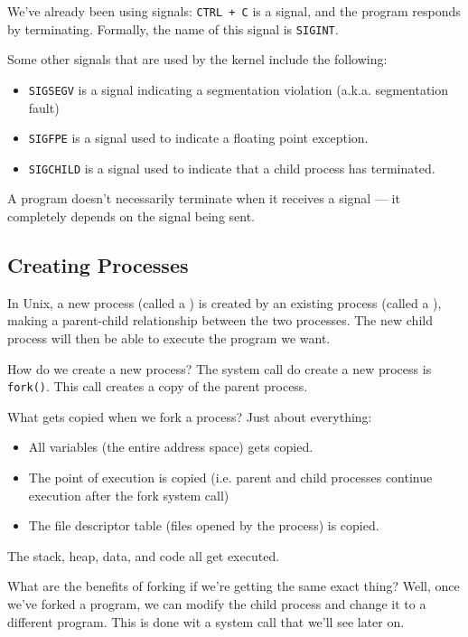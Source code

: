 We've already been using signals: \verb!CTRL + C! is a signal, and the program responds by terminating. Formally, the name of this signal is \verb!SIGINT!. 

Some other signals that are used by the kernel include the following: \begin{itemize}
    \item \verb!SIGSEGV! is a signal indicating a segmentation violation (a.k.a. segmentation fault)
    \item \verb!SIGFPE! is a signal used to indicate a floating point exception.
    \item \verb!SIGCHILD! is a signal used to indicate that a child process has terminated.
\end{itemize}

A program doesn't necessarily terminate when it receives a signal --- it completely depends on the signal being sent.

\subsection{Creating Processes}

In Unix, a new process (called a ) is created by an existing process (called a ), making a parent-child relationship between the two processes. The new child process will then be able to execute the program we want. 

How do we create a new process? The system call do create a new process is \verb!fork()!. This call creates a copy of the parent process. 

What gets copied when we fork a process? Just about everything: \begin{itemize}
    \item All variables (the entire address space) gets copied.
    \item The point of execution is copied (i.e. parent and child processes continue execution after the fork system call)
    \item The file descriptor table (files opened by the process) is copied.
\end{itemize}

The stack, heap, data, and code all get executed.



What are the benefits of forking if we're getting the same exact thing? Well, once we've forked a program, we can modify the child process and change it to a different program. This is done wit a system call that we'll see later on.

